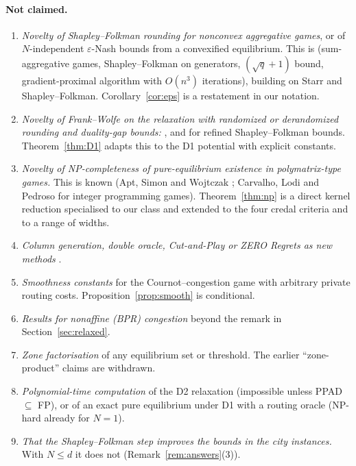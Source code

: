 \documentclass[11pt]{article}
\theoremstyle{definition}
\theoremstyle{remark}
\begin{document}
\paragraph{Not claimed.}
\begin{enumerate}[label=(N\arabic*)]
\item \emph{Novelty of Shapley--Folkman rounding for nonconvex aggregative games}, or of $N$-independent $\varepsilon$-Nash bounds from a convexified equilibrium. This is \cite{LOW23} (sum-aggregative games, Shapley--Folkman on generators, $(\sqrt q+1)$ bound, gradient-proximal algorithm with $O(n^3)$ iterations), building on Starr \cite{Starr69} and Shapley--Folkman. Corollary~\ref{cor:eps} is a restatement in our notation.
\item \emph{Novelty of Frank--Wolfe on the relaxation with randomized or derandomized rounding and duality-gap bounds:} \cite{AE76,UB16,BLOPW23,DTdA24}, and \cite{DX26} for refined Shapley--Folkman bounds. Theorem~\ref{thm:D1} adapts this to the D1 potential with explicit constants.
\item \emph{Novelty of NP-completeness of pure-equilibrium existence in polymatrix-type games.} This is known (Apt, Simon and Wojtczak \cite{ASW22}; Carvalho, Lodi and Pedroso \cite{CLP22} for integer programming games). Theorem~\ref{thm:np} is a direct kernel reduction specialised to our class and extended to the four credal criteria and to a range of widths.
\item \emph{Column generation, double oracle, Cut-and-Play or ZERO Regrets as new methods} \cite{MGB03,CDLS25,DS23,CLP22}.
\item \emph{Smoothness constants} for the Cournot--congestion game with arbitrary private routing costs. Proposition~\ref{prop:smooth} is conditional.
\item \emph{Results for nonaffine (BPR) congestion} beyond the remark in Section~\ref{sec:relaxed}.
\item \emph{Zone factorisation} of any equilibrium set or threshold. The earlier ``zone-product'' claims are withdrawn.
\item \emph{Polynomial-time computation} of the D2 relaxation (impossible unless PPAD $\subseteq$ FP), or of an exact pure equilibrium under D1 with a routing oracle (NP-hard already for $N=1$).
\item \emph{That the Shapley--Folkman step improves the bounds in the city instances.} With $N\le d$ it does not (Remark~\ref{rem:answers}(3)).
\end{enumerate}
\end{document}
